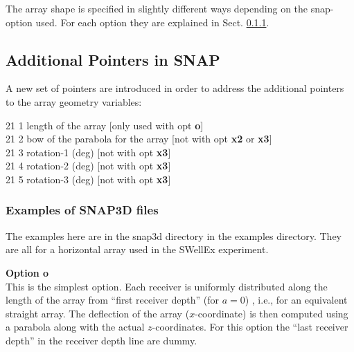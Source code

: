 \documentclass{saclantc}
\begin{document}
The array shape is specified in slightly different ways depending on
the snap-option used. For each option they are explained in Sect. \ref{se:snap3dex}.


\subsection{Additional Pointers in SNAP}
A new set of pointers are introduced in order to address the additional
pointers to the array geometry variables:

21  1 \hspace{1cm}   length of the array [only used with opt {\bf o}]\\
21  2 \hspace{1cm}   bow of the parabola for the array [not with opt
{\bf x2} or {\bf x3}]\\
21  3  \hspace{1cm}  rotation-1 (deg) [not with opt {\bf x3}]\\
21  4  \hspace{1cm}  rotation-2 (deg) [not with opt {\bf x3}]\\
21  5  \hspace{1cm}  rotation-3 (deg) [not with opt {\bf x3}]

\subsubsection{Examples of SNAP3D files}
\label{se:snap3dex}
The examples here are in the snap3d directory in the examples
directory.
They are all for a horizontal array used in the SWellEx experiment.

{\large \bf Option o}\\
This is the simplest option. 
Each receiver is uniformly distributed along the length of the array from
``first receiver depth'' (for $a=0$) , i.e., for an equivalent straight array. The deflection of the
array ($x$-coordinate) is then computed using a parabola along with
the actual $z$-coordinates. 
For this option the ``last receiver depth'' 
in the receiver depth line are dummy.
\end{document}
